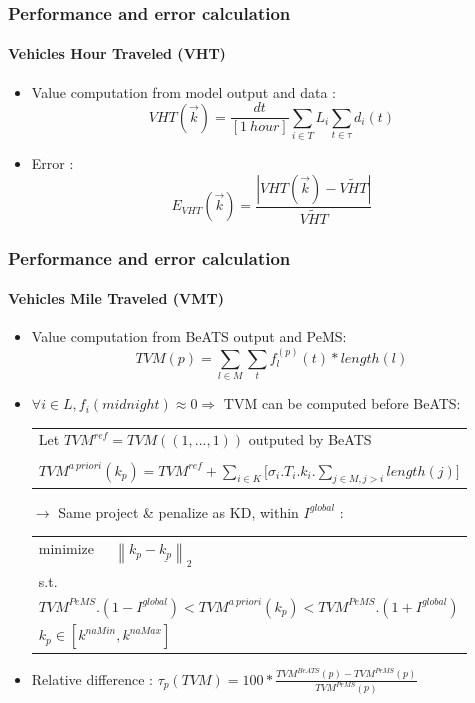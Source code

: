 \documentclass[fleqn]{beamer}
\newcommand\norm[1]{\left\lVert#1\right\rVert}
\begin{document}
\begin{frame}
	\frametitle{Performance and error calculation}
	\framesubtitle{Vehicles Hour Traveled (VHT)}
	\begin{itemize}
		\item Value computation from model output and data : 
		\begin{equation*}
				 VHT(\vec{k})=\frac{dt}{[1\ hour]}\sum_{i\in{T}}L_{i}\sum_{t\in \tau}d_{i}(t)
		\end{equation*}
		\item Error : 
		\begin{equation*}
			E_{VHT}(\vec{k})=\frac{|VHT(\vec{k})-\widetilde{VHT}|}{\widetilde{VHT}}
		\end{equation*}
	\end{itemize}
\end{frame}

\begin{frame}
	\frametitle{Performance and error calculation}
	\framesubtitle{Vehicles Mile Traveled (VMT)}
	\begin{itemize}
		\item Value computation from BeATS output and PeMS: 
		\begin{equation*}
			TVM(p)=\sum_{l\in{M}}\sum_{t}f^{(p)}_{l}(t)*length(l)
		\end{equation*}
		\item $\forall i\in{L}, f_{i}(midnight)\approx 0\Rightarrow$ TVM can be computed before BeATS:
		\begin{tabular}{l}
			Let $TVM^{ref}=TVM((1,...,1))$ outputed by BeATS\\
			\\
			\small{$TVM^{a\ priori}(k_{p})=TVM^{ref}+\sum_{i\in{K}}\biggl[\sigma_{i}.T_{i}.k_{i}.\sum_{j\in{M},j>i}length(j)\biggr]$}			
		\end{tabular}
		\item[$\rightarrow$] Same project \& penalize as KD, within $I^{global}$ :
		\begin{tabular}{l}
			minimize \small{$\ \ \ \ \ \norm{k_{p}-\underline{k_{p}}}_{2}$}\\
			s.t.\\
			\small{$TVM^{PeMS}.(1-I^{global})< TVM^{a\ priori}(k_{p})<TVM^{PeMS}.(1+I^{global})$}\\
			\small{$k_{p}\in{[k^{naMin},k^{naMax}]}$}\\
		\end{tabular}
		\item Relative difference : $\tau_{p}(TVM)=100* \frac{TVM^{BeATS}(p)-TVM^{PeMS}(p)}{TVM^{PeMS}(p)}$
	\end{itemize}
\end{frame}
\end{document}
